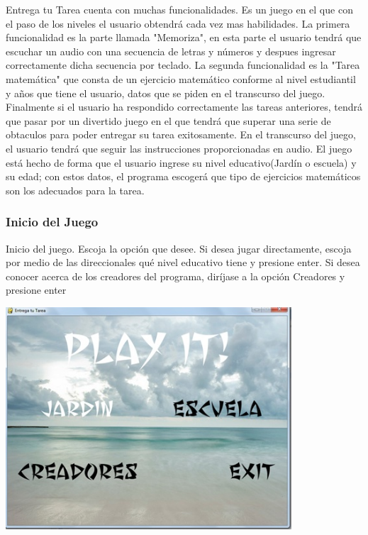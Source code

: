 \documentclass[12pt]{article}
\begin{document}
{{{\begin{flushleft}
\normalsize
Entrega tu Tarea cuenta con muchas funcionalidades. Es un juego en el que con el paso de los niveles el usuario obtendrá cada vez mas habilidades.
\newline
\newline
La primera funcionalidad es la parte llamada "Memoriza", en esta parte el usuario tendrá que escuchar un audio con una secuencia de letras y números y despues ingresar correctamente dicha secuencia por teclado.
\newline
\newline
La segunda funcionalidad es la "Tarea matemática"  que consta de un ejercicio matemático conforme al nivel estudiantil y años que tiene el usuario, datos que se piden en el transcurso del juego.	
\newline
\newline	
Finalmente si el usuario ha respondido correctamente las tareas anteriores, tendrá que pasar por un divertido juego en el que tendrá que superar una serie de obtaculos para poder entregar su tarea exitosamente.
\newline
\newline
En el transcurso del juego, el usuario tendrá que seguir las instrucciones proporcionadas en audio.
\newline
\newline
El juego está hecho de forma que el usuario ingrese su nivel educativo(Jardín o escuela) y su edad; con estos datos, el programa escogerá que tipo de ejercicios matemáticos son los adecuados para la tarea.

\subsubsection{Inicio del Juego}
\vspace{0.1in}
Inicio del juego. Escoja la opción que desee. Si desea jugar directamente, escoja por medio de las direccionales qué nivel educativo tiene y presione enter. Si desea conocer acerca de los creadores del programa, diríjase a la opción Creadores y presione enter
\vspace{0.3in}

	\begin{center}
		\begingroup
			\includegraphics[width=0.8\textwidth]{imagenes_usuario/inicio.jpg}
		\endgroup
	\end{center}


\end{flushleft}}}}
\end{document}
